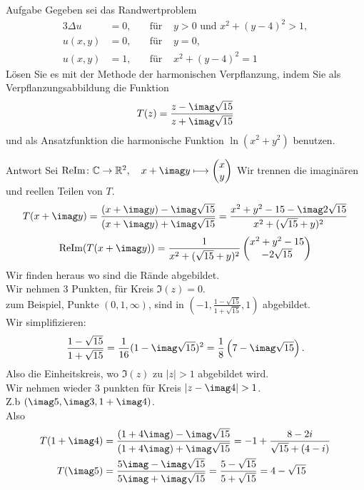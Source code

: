 \documentclass{scrartcl}
\def\mbb#1{\mathbb{#1}}
\def\bC{\mbb{C}}
\def\bR{\mbb{R}}
\newcommand{\func}[3]{#1\colon#2\to#3}
\newcommand{\vfunc}[5]{\func{#1}{#2}{#3},\quad#4\longmapsto#5}
\let\-\rightarrow
\begin{document}
\begin{section}{Aufgabe}%
Gegeben sei das Randwertproblem
\begin{alignat*}{3}
 \Delta u&=0,\quad &\text{für }& y>0\text{ und }x^2+(y-4)^2>1,\\
u(x,y)&=0,\quad &\text{für }& y=0,\\
 u(x,y)&=1,\quad &\text{für }& x^2+(y-4)^2=1
\end{alignat*}
Lösen Sie es mit der Methode der harmonischen Verpflanzung, indem Sie als Verpflanzungsabbildung die Funktion
\[T(z)=\frac{z-\imag \sqrt{15}}{z+\imag \sqrt{15}}\]
und als Ansatzfunktion die harmonische Funktion $\ln(x^2+ y^2)$ benutzen.
\begin{subsection}{Antwort}
    Sei $\vfunc{\text{ReIm}}{\bC}{\bR^2}{x+\imag y}{\begin{pmatrix}x\\y\end{pmatrix}}$
    Wir trennen die imaginären und reellen Teilen von $T$.
    \[
    T(x+\imag y)
    =\frac{(x+\imag y)-\imag \sqrt{15}}{(x+\imag y)+\imag \sqrt{15}}
    =\frac{x^2+y^2-15-\imag 2\sqrt{15}}{x^2+(\sqrt{15}+y)^2}
    \]
    \[\text{ReIm}(T(x+\imag y))=\frac{1}{x^2+(\sqrt{15}+y)^2}
    \begin{pmatrix}
        x^2+y^2-15\\-2\sqrt{15}
    \end{pmatrix}
    \]
    Wir finden heraus wo sind die Rände abgebildet.\\
    Wir nehmen 3 Punkten, für Kreis $\Im(z)=0$.\\
    zum Beispiel, Punkte $\left(0,1,\infty\right)$, sind in $\left(-1,\frac{1-\sqrt{15}}{1+\sqrt{15}},1\right)$ abgebildet.\\
    Wir simplifizieren:
    \[\frac{1-\sqrt{15}}{1+\sqrt{15}}=\frac{1}{16}(1-\imag\sqrt{15})^2=\frac{1}{8}\left(7-\imag\sqrt{15}\right).\] Also die Einheitskreis, wo $\Im(z)$ zu $|z|>1$ abgebildet wird.\\
    Wir nehmen wieder 3 punkten für Kreis $|z-\imag 4|>1$.\\
    Z.b $\left(\imag 5,\imag 3,1+\imag 4\right)$.\\
    Also
    \begin{align*}
        T(1+\imag 4)&=\frac{(1+4 \imag)-\imag \sqrt{15}}{(1+4 \imag)+\imag \sqrt{15}}=-1+\frac{8-2 i}{\sqrt{15}+(4-i)}\\
        T(\imag 5)&=\frac{5 \imag-\imag \sqrt{15}}{5 \imag+\imag \sqrt{15}}=\frac{5-\sqrt{15}}{5 +\sqrt{15}}=4-\sqrt{15}\\

\end{align*}
\end{subsection}
\end{section}
\end{document}
